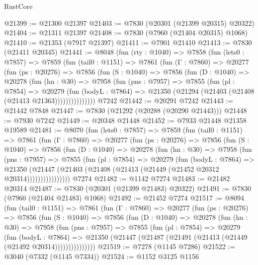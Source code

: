 \begin{lexlean}{RustCore}
\begin{coremodule}
@21399 := @21300 @21397
@21403 := @7830 (@20301 (@21399 @20315) @20322)
@21404 := @21311 @21397
@21408 := @7830 (@7960 (@21404 @20315) @1068)
@21410 := @21353 (@7917 @21397)
@21411 := @7901 @21410
@21413 := @7830 (@21411 @20345)
@21441 := @8048
    (fun (rty : @1040) =>
    @7858
      (fun (lets0 : @7857) =>
      @7859
        (fun (tail0 : @1151) =>
        @7861
          (fun (Γ : @7860) =>
          @20277
            (fun (ps : @20276) =>
            @7856
              (fun (S : @1040) =>
              @7856
                (fun (D : @1040) =>
                @20278
                  (fun (hn : @30) =>
                  @7958
                    (fun (pns : @7957) =>
                    @7855
                      (fun (pl : @7854) =>
                      @20279
                        (fun (bodyL : @7864) =>
                        @21350 (@21294 (@21403 (@21408 (@21413 @21363)))))))))))))))
    @7242
@21442 := @20291 @7242
@21443 := @21442 @7848
@21447 := @7830 (@21292 (@20288 (@20290 @21443)))
@21448 := @7930 @7242
@21449 := @20348 @21448
@21452 := @7933 @21448 @21358 @19589
@21481 := @8070
    (fun (lets0 : @7857) =>
    @7859
      (fun (tail0 : @1151) =>
      @7861
        (fun (Γ : @7860) =>
        @20277
          (fun (ps : @20276) =>
          @7856
            (fun (S : @1040) =>
            @7856
              (fun (D : @1040) =>
              @20278
                (fun (hn : @30) =>
                @7958
                  (fun (pns : @7957) =>
                  @7855
                    (fun (pl : @7854) =>
                    @20279
                      (fun (bodyL : @7864) =>
                      @21350
                        (@21447
                          (@21403 (@21408 (@21413 (@21449 (@21452 @20312 @20314))))))))))))))))
    @7274
@21482 := @1142 @7274
@21483 := @21482 @20314
@21487 := @7830 (@20301 (@21399 @21483) @20322)
@21491 := @7830 (@7960 (@21404 @21483) @1068)
@21492 := @21452 @7274
@21517 := @8094
    (fun (tail0 : @1151) =>
    @7861
      (fun (Γ : @7860) =>
      @20277
        (fun (ps : @20276) =>
        @7856
          (fun (S : @1040) =>
          @7856
            (fun (D : @1040) =>
            @20278
              (fun (hn : @30) =>
              @7958
                (fun (pns : @7957) =>
                @7855
                  (fun (pl : @7854) =>
                  @20279
                    (fun (bodyL : @7864) =>
                    @21350 (@21447 (@21487 (@21491 (@21413 (@21449 (@21492 @20314)))))))))))))))
@21519 := @7278 (@1145 @7286)
@21522 := @3040 (@7332 (@1145 @7334))
@21524 := @1152 @3125 @1156

\end{coremodule}
\end{lexlean}

